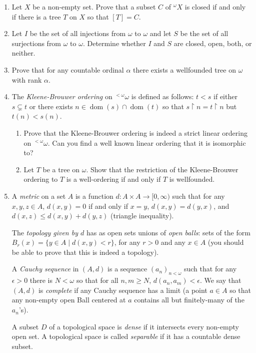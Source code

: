 \documentclass{amsart}
\theoremstyle{definition}
\newcommand{\seq}[2]{\left(#1\right)_{#2}}
\newcommand{\fct}[2]{{}^{#1} {#2}}
\newcommand{\dom}{\operatorname{dom}}
\newcommand{\rest}{\upharpoonright}
\begin{document}
\begin{enumerate}
\item Let $X$ be a non-empty set. Prove that a subset $C$ of $\fct{\omega}{X}$ is closed if and only if there is a tree $T$ on $X$ so that $[T] = C$.
\item Let $I$ be the set of all injections from $\omega$ to $\omega$ and let $S$ be the set of all surjections from $\omega$ to $\omega$. Determine whether $I$ and $S$ are closed, open, both, or neither.  
\item Prove that for any countable ordinal $\alpha$ there exists a wellfounded tree on $\omega$ with rank $\alpha$.
\item The \emph{Kleene-Brouwer ordering} on $\fct{<\omega}{\omega}$ is defined as follows: $t < s$ if either $s \subsetneq t$ or there exists $n \in \dom (s) \cap \dom (t)$ so that $s \rest n = t \rest n$ but $t (n) < s (n)$.

  \begin{enumerate}
  \item Prove that the Kleene-Brouwer ordering is indeed a strict linear ordering on $\fct{<\omega}{\omega}$. Can you find a well known linear ordering that it is isomorphic to?
  \item Let $T$ be a tree on $\omega$. Show that the restriction of the Kleene-Brouwer ordering to $T$ is a well-ordering if and only if $T$ is wellfounded.
  \end{enumerate}
\item A \emph{metric} on a set $A$ is a function $d: A \times A \to [0, \infty)$ such that for any $x, y, z \in A$, $d (x, y) = 0$ if and only if $x = y$, $d (x,  y) = d (y, x)$, and $d (x, z) \le d (x, y) + d (y, z)$ (triangle inequality).

  The \emph{topology given by $d$} has as open sets unions of \emph{open balls}: sets of the form $B_r (x) = \{y \in A \mid d (x, y) < r\}$, for any $r > 0$ and any $x \in A$ (you should be able to prove that this is indeed a topology).

  A \emph{Cauchy sequence} in $(A, d)$ is a sequence $\seq{a_n}{n < \omega}$ such that for any $\epsilon > 0$ there is $N < \omega$ so that for all $n, m \ge N$, $d (a_n, a_m) < \epsilon$. We say that $(A, d)$ is \emph{complete} if any Cauchy sequence has a limit (a point $a \in A$ so that any non-empty open Ball centered at $a$ contains all but finitely-many of the $a_n$'s).

  A subset $D$ of a topological space is \emph{dense} if it intersects every non-empty open set. A topological space is called \emph{separable} if it has a countable dense subset.


\end{enumerate}
\end{document}
